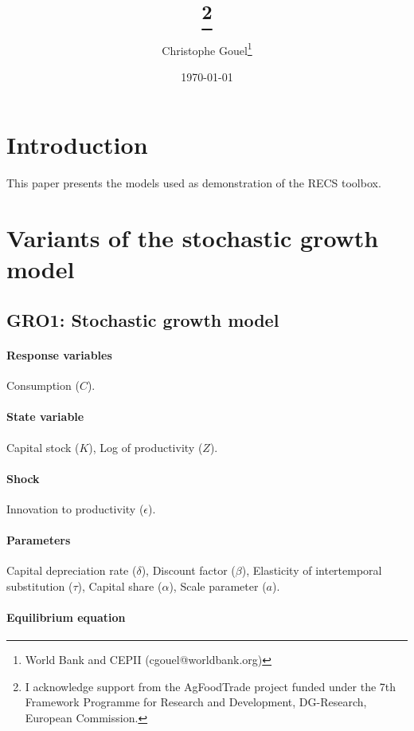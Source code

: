 \documentclass[11pt,fleqn]{article}
\title{\MyTitle%
  \thanks{I acknowledge support from the AgFoodTrade project funded under the 7th Framework
    Programme for Research and Development, DG-Research, European Commission.}}%
\date{\today}%
\author{Christophe Gouel\footnote{World Bank and CEPII
    (cgouel@worldbank.org)}}
\begin{document}
\maketitle

\tableofcontents

\section{Introduction}
\label{sec:introduction}

This paper presents the models used as demonstration of the RECS toolbox.

\section{Variants of the stochastic growth model}
\label{sec:sto-grow}

\subsection{GRO1: Stochastic growth model}
\label{sec:gro1}

\paragraph{Response variables}

Consumption ($C$).

\paragraph{State variable}

Capital stock ($K$), Log of productivity ($Z$).

\paragraph{Shock}

Innovation to productivity ($\epsilon$).

\paragraph{Parameters}

Capital depreciation rate ($\delta$), Discount factor ($\beta$), Elasticity of
intertemporal substitution ($\tau$), Capital share ($\alpha$), Scale parameter
($a$).

\paragraph{Equilibrium equation}
\end{document}
